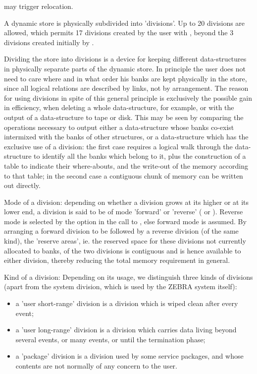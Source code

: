  may trigger relocation.

A dynamic store is physically subdivided into 'divisions'.
Up to 20 divisions are allowed, which permits 17 divisions
created by the user with , beyond the 3 divisions
created initially by .

Dividing the store into divisions is a device for keeping
different data-structures in physically separate parts
of the dynamic store.
In principle the user does not need to care where and in what
order his banks are kept physically in the store,
since all logical relations are described by links,
not by arrangement.
The reason for using divisions in spite of this general principle
is exclusively the possible gain in efficiency,
when deleting a whole data-structure, for example,
or with the output of a data-structure to tape or disk.
This may be seen by comparing the operations necessary to output
either a data-structure whose banks co-exist intermixed with
the banks of other structures, or a data-structure which has
the exclusive use of a division:
the first case requires a logical walk through the data-structure
to identify all the banks which belong to it,
plus the construction of a table to indicate their where-abouts,
and the write-out of the memory according to that table;
in the second case a contiguous chunk of memory
can be written out directly.

Mode of a division:  depending on whether a division grows
at its higher or at its lower end,
a division is said to be of mode 'forward' or 'reverse'
( or ).
Reverse mode is selected by the  option in the call to ,
else forward mode is assumed.
By arranging a forward division to be followed by a reverse
division (of the same kind),
the 'reserve areas', ie. the reserved space for these divisions
not currently allocated to banks,
of the two divisions is contiguous and is hence available
to either division,
thereby reducing the total memory requirement in general.

Kind of a division:  Depending on its usage,
we distinguish three kinds of divisions (apart from the
system division, which is used by the ZEBRA system itself):

\begin{itemize}
\item a 'user short-range' division is a division which is
      wiped clean after every event;
\item a 'user long-range' division is a division which carries
      data living beyond several events,
      or many events, or until the termination phase;
\item a 'package' division is a division used by some service
      packages,
      and whose contents are not normally of any concern to the user.
\end{itemize}

